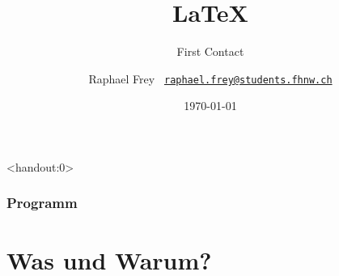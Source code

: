 \documentclass{beamer}                %
\title{\vspace*{4em}\Huge\LaTeX}
\subtitle{\hfill First Contact}
\date{\today}
\author{%
    Raphael Frey%
    \hfill%
    \footnotesize\texttt{%
        \href{mailto:raphael.frey@students.fhnw.ch}%
        {raphael.frey@students.fhnw.ch}}}
\begin{document}
                                                              

\frame[plain]{\titlepage} %


\begin{frame}<handout:0> %
    \frametitle{Programm}
    \tableofcontents
\end{frame}


\section<handout:0>{Was und Warum?} %
\end{document}
